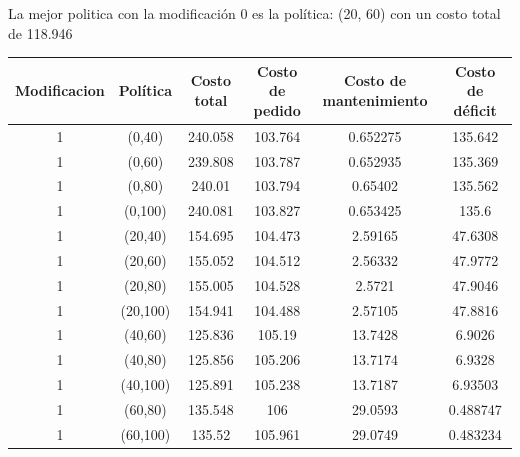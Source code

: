 \documentclass[12pt, spanish]{article}
\begin{document}
La mejor politica con la modificación 0 es la política: (20, 60) con un costo total de 118.946




\begin{table}[H]
\begin{tabular}{|c|c|c|c|c|c|}
\hline
\textbf{Modificacion} & \textbf{Política} & \textbf{Costo total} & \textbf{Costo de pedido} & \textbf{Costo de mantenimiento} & \textbf{Costo de déficit} \\ \hline
1                     & (0,40)            & 240.058              & 103.764                  & 0.652275                        & 135.642                   \\ \hline
1                     & (0,60)            & 239.808              & 103.787                  & 0.652935                        & 135.369                   \\ \hline
1                     & (0,80)            & 240.01               & 103.794                  & 0.65402                         & 135.562                   \\ \hline
1                     & (0,100)           & 240.081              & 103.827                  & 0.653425                        & 135.6                     \\ \hline
1                     & (20,40)           & 154.695              & 104.473                  & 2.59165                         & 47.6308                   \\ \hline
1                     & (20,60)           & 155.052              & 104.512                  & 2.56332                         & 47.9772                   \\ \hline
1                     & (20,80)           & 155.005              & 104.528                  & 2.5721                          & 47.9046                   \\ \hline
1                     & (20,100)          & 154.941              & 104.488                  & 2.57105                         & 47.8816                   \\ \hline
1                     & (40,60)           & 125.836              & 105.19                   & 13.7428                         & 6.9026                    \\ \hline
1                     & (40,80)           & 125.856              & 105.206                  & 13.7174                         & 6.9328                    \\ \hline
1                     & (40,100)          & 125.891              & 105.238                  & 13.7187                         & 6.93503                   \\ \hline
1                     & (60,80)           & 135.548              & 106                      & 29.0593                         & 0.488747                  \\ \hline
1                     & (60,100)          & 135.52               & 105.961                  & 29.0749                         & 0.483234                  \\ \hline
\end{tabular}
\end{table}
\end{document}
